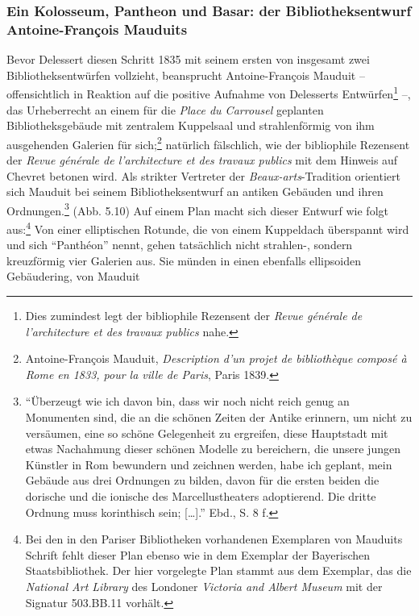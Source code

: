 \subsubsection{Ein Kolosseum, Pantheon und Basar: der Bibliotheksentwurf
Antoine-François
Mauduits}\label{ein-kolosseum-pantheon-und-basar-der-bibliotheksentwurf-antoine-franuxe7ois-mauduits}

Bevor Delessert diesen Schritt 1835 mit seinem ersten von insgesamt zwei
Bibliotheksentwürfen vollzieht, beansprucht Antoine-François Mauduit --
offensichtlich in Reaktion auf die positive Aufnahme von Delesserts
Entwürfen\footnote{Dies zumindest legt der bibliophile Rezensent der
  \emph{Revue générale de l'architecture et des travaux publics} nahe.}
--, das Urheberrecht an einem für die \emph{Place du Carrousel}
geplanten Bibliotheksgebäude mit zentralem Kuppelsaal und strahlenförmig
von ihm ausgehenden Galerien für sich;\footnote{Antoine-François
  Mauduit, \emph{Description d'un projet de bibliothèque composé à Rome
  en 1833, pour la ville de Paris}, Paris 1839.} natürlich fälschlich,
wie der bibliophile Rezensent der \emph{Revue générale de l'architecture
et des travaux publics} mit dem Hinweis auf Chevret betonen wird. Als
strikter Vertreter der \emph{Beaux-arts}-Tradition orientiert sich
Mauduit bei seinem Bibliotheksentwurf an antiken Gebäuden und ihren
Ordnungen.\footnote{\enquote{Überzeugt wie ich davon bin, dass wir noch
  nicht reich genug an Monumenten sind, die an die schönen Zeiten der
  Antike erinnern, um nicht zu versäumen, eine so schöne Gelegenheit zu
  ergreifen, diese Hauptstadt mit etwas Nachahmung dieser schönen
  Modelle zu bereichern, die unsere jungen Künstler in Rom bewundern und
  zeichnen werden, habe ich geplant, mein Gebäude aus drei Ordnungen zu
  bilden, davon für die ersten beiden die dorische und die ionische des
  Marcellustheaters adoptierend. Die dritte Ordnung muss korinthisch
  sein; {[}\ldots{}{]}.} Ebd., S. 8 f.} (Abb. 5.10) Auf einem Plan macht
sich dieser Entwurf wie folgt aus:\footnote{Bei den in den Pariser
  Bibliotheken vorhandenen Exemplaren von Mauduits Schrift fehlt dieser
  Plan ebenso wie in dem Exemplar der Bayerischen Staatsbibliothek. Der
  hier vorgelegte Plan stammt aus dem Exemplar, das die \emph{National
  Art Library} des Londoner \emph{Victoria and Albert Museum} mit der
  Signatur 503.BB.11 vorhält.} Von einer elliptischen Rotunde, die von
einem Kuppeldach überspannt wird und sich \enquote{Panthéon} nennt,
gehen tatsächlich nicht strahlen-, sondern kreuzförmig vier Galerien
aus. Sie münden in einen ebenfalls ellipsoiden Gebäudering, von Mauduit
